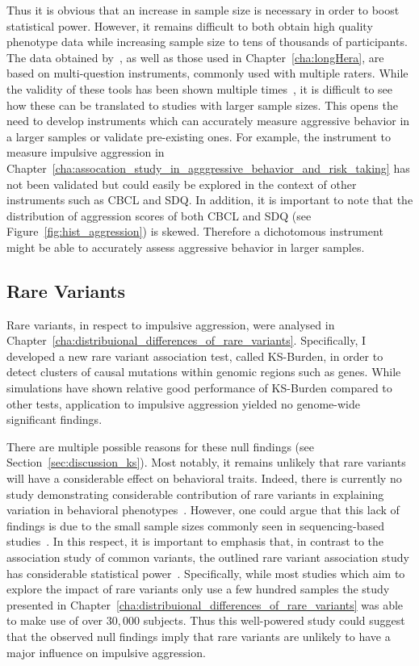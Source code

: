 Thus it is obvious that an increase in sample size is necessary in order to boost statistical power.
However, it remains difficult to both obtain high quality phenotype data while increasing sample size to tens of thousands of participants.
The data obtained by~\citet{Pappa2016a}, as well as those used in Chapter~\ref{cha:longHera}, are based on multi-question instruments, commonly used with multiple raters.
While the validity of these tools has been shown multiple times~\cite{Goodman1997,Goodman2001,Achenbach2003}, it is difficult to see how these can be translated to studies with larger sample sizes.
This opens the need to develop instruments which can accurately measure aggressive behavior in a larger samples or validate pre-existing ones.  
For example, the  instrument to measure impulsive aggression in Chapter~\ref{cha:assocation_study_in_agggressive_behavior_and_risk_taking} has not been validated but could easily be explored in the context of other instruments such as CBCL and SDQ\@.
In addition, it is important to note that the distribution of aggression scores of both CBCL and SDQ (see Figure~\ref{fig:hist_aggression}) is skewed.
Therefore a dichotomous instrument might be able to accurately assess aggressive behavior in larger samples. 

\subsection{Rare Variants}
\label{sub:rare_variants_disccusion}

Rare variants, in respect to impulsive aggression, were analysed in Chapter~\ref{cha:distribuional_differences_of_rare_variants}.
Specifically, I developed a new rare variant association test, called KS-Burden, in order to detect clusters of causal mutations within genomic regions such as genes.
While simulations have shown relative good performance of KS-Burden compared to other tests, application to impulsive aggression yielded no genome-wide significant findings. 

There are multiple possible reasons for these null findings (see Section~\ref{sec:discussion_ks}).
Most notably, it remains unlikely that rare variants will have a considerable effect on behavioral traits.
Indeed, there is currently no study demonstrating considerable contribution of rare variants in explaining variation in behavioral phenotypes~\cite{Chabris2015}.
However, one could argue that this lack of findings is due to the small sample sizes commonly seen in sequencing-based studies~\cite{Lee2014}. 
In this respect, it is important to emphasis that, in contrast to the association study of common variants, the outlined rare variant association study has considerable statistical power~\cite{Lee2011}.
Specifically, while most studies which aim to explore the impact of rare variants only use a few hundred samples the study presented in Chapter~\ref{cha:distribuional_differences_of_rare_variants} was able to make use of over $30,000$ subjects. 
Thus this well-powered study could suggest that the observed  null findings imply that rare variants are unlikely to have a major influence on impulsive aggression.

